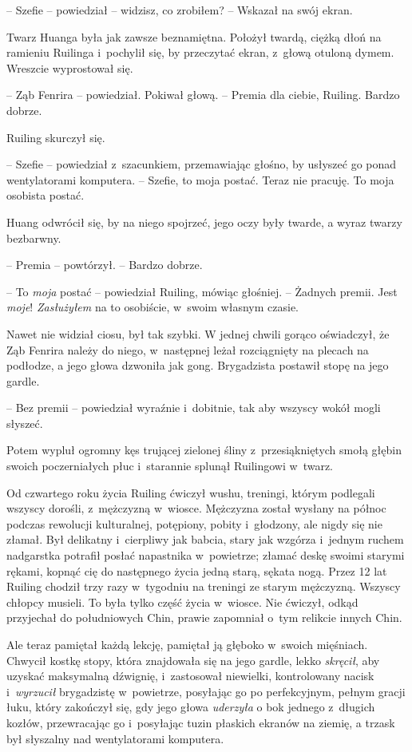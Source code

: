 \documentclass[oneside,polish,11pt,rmheadings]{mwbk}
\begin{document}
-- Szefie -- powiedział -- widzisz, co zrobiłem? -- Wskazał na swój ekran.

Twarz Huanga była jak zawsze beznamiętna. Położył twardą, ciężką dłoń na ramieniu Ruilinga i~pochylił się, by przeczytać ekran, z~głową otuloną dymem. Wreszcie wyprostował się. 

-- Ząb Fenrira -- powiedział. Pokiwał głową. -- Premia dla ciebie, Ruiling. Bardzo dobrze.

Ruiling skurczył się.

-- Szefie -- powiedział z~szacunkiem, przemawiając głośno, by usłyszeć go ponad wentylatorami komputera. -- Szefie, to moja postać. Teraz nie pracuję. To moja osobista postać.

Huang odwrócił się, by na niego spojrzeć, jego oczy były twarde, a wyraz twarzy bezbarwny. 

-- Premia -- powtórzył. -- Bardzo dobrze. 

-- To \textit{moja }postać -- powiedział Ruiling, mówiąc głośniej. -- Żadnych premii. Jest \textit{moje}! \textit{Zasłużyłem }na to osobiście, w~swoim własnym czasie.

Nawet nie widział ciosu, był tak szybki. W jednej chwili gorąco oświadczył, że Ząb Fenrira należy do niego, w~następnej leżał rozciągnięty na plecach na podłodze, a jego głowa dzwoniła jak gong. Brygadzista postawił stopę na jego gardle.


-- Bez premii -- powiedział wyraźnie i~dobitnie, tak aby wszyscy wokół mogli słyszeć. 

Potem wypluł ogromny kęs trującej zielonej śliny z~przesiąkniętych smołą głębin swoich poczerniałych płuc i~starannie splunął Ruilingowi w~twarz.

Od czwartego roku życia Ruiling ćwiczył wushu, treningi, którym podlegali wszyscy dorośli, z~mężczyzną w~wiosce. Mężczyzna został wysłany na północ podczas rewolucji kulturalnej, potępiony, pobity i~głodzony, ale nigdy się nie złamał. Był delikatny i~cierpliwy jak babcia, stary jak wzgórza i~jednym ruchem nadgarstka potrafił posłać napastnika w~powietrze; złamać deskę swoimi starymi rękami, kopnąć cię do następnego życia jedną starą, sękata nogą. Przez 12 lat Ruiling chodził trzy razy w~tygodniu na treningi ze starym mężczyzną. Wszyscy chłopcy musieli. To była tylko część życia w~wiosce. Nie ćwiczył, odkąd przyjechał do południowych Chin, prawie zapomniał o~tym relikcie innych Chin.

Ale teraz pamiętał każdą lekcję, pamiętał ją głęboko w~swoich mięśniach. Chwycił kostkę stopy, która znajdowała się na jego gardle, lekko \textit{skręcił}, aby uzyskać maksymalną dźwignię, i~zastosował niewielki, kontrolowany nacisk i~\textit{wyrzucił }brygadzistę w~powietrze, posyłając go po perfekcyjnym, pełnym gracji łuku, który zakończył się, gdy jego głowa \textit{uderzyła }o bok jednego z~długich kozłów, przewracając go i~posyłając tuzin płaskich ekranów na ziemię, a trzask był słyszalny nad wentylatorami komputera.
\end{document}
